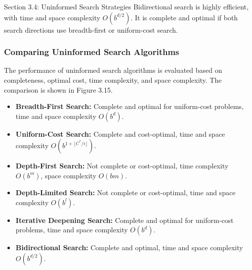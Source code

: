 \begin{notes}{Section 3.4: Uninformed Search Strategies}
    Bidirectional search is highly efficient, with time and space complexity $O(b^{d/2})$. It is complete and optimal if both search directions use breadth-first or uniform-cost search.

    \subsubsection*{Comparing Uninformed Search Algorithms}

    The performance of uninformed search algorithms is evaluated based on completeness, optimal cost, time complexity, and space complexity. The comparison is shown in Figure 3.15.

    \begin{highlight}
        \begin{itemize}
            \item \textbf{Breadth-First Search:} Complete and optimal for uniform-cost problems, time and space complexity $O(b^d)$.
            \item \textbf{Uniform-Cost Search:} Complete and cost-optimal, time and space complexity $O(b^{1 + \lfloor C^* / \epsilon \rfloor})$.
            \item \textbf{Depth-First Search:} Not complete or cost-optimal, time complexity $O(b^m)$, space complexity $O(bm)$.
            \item \textbf{Depth-Limited Search:} Not complete or cost-optimal, time and space complexity $O(b^l)$.
            \item \textbf{Iterative Deepening Search:} Complete and optimal for uniform-cost problems, time and space complexity $O(b^d)$.
            \item \textbf{Bidirectional Search:} Complete and optimal, time and space complexity $O(b^{d/2})$.
        \end{itemize}
    \end{highlight}
\end{notes}
